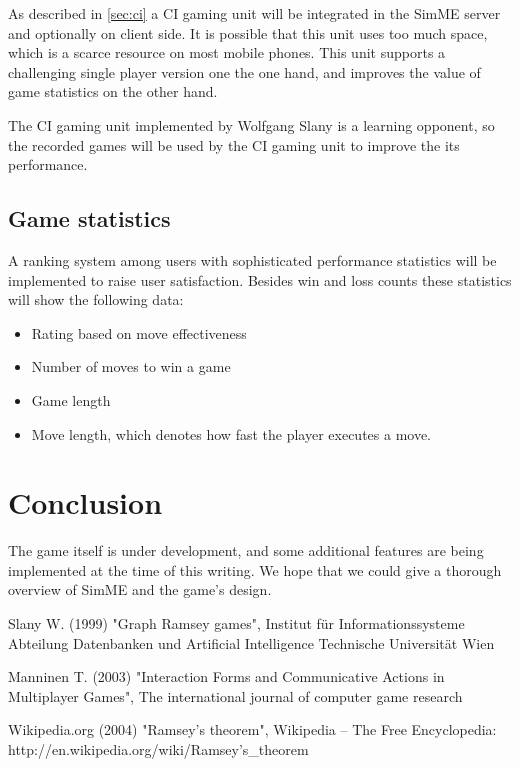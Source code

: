 		As described in \ref{sec:ci} a CI gaming unit will be integrated in the
		SimME server and optionally on client side. It is possible that this
		unit uses too much space, which is a scarce resource on most mobile
		phones. This unit supports a challenging single player version one the
		one hand, and improves the value of game statistics on the other hand.
		
		The CI gaming unit implemented by Wolfgang Slany is a learning opponent,
		so the recorded games will be used by the CI gaming unit to improve the
		its performance.
	
	\subsection{Game statistics}

		A ranking system among users with sophisticated performance statistics
		will be implemented to raise user satisfaction. Besides win and loss
		counts these statistics will show the following data:
		
		\begin{itemize}
		
			\item Rating based on move effectiveness
			
			\item Number of moves to win a game
		
			\item Game length
			
			\item Move length, which denotes how fast the player executes a move.
		
		\end{itemize}


\section{Conclusion}

	The game itself is under development, and some additional features are being
	implemented at the time of this writing. We hope that we could give a
	thorough overview of SimME and the game's design.



\begin{thebibliography}{10}

	 Slany W. (1999) "Graph Ramsey games",
	Institut f\"ur Informationssysteme Abteilung Datenbanken und Artificial
	Intelligence Technische Universit\"at Wien
	
	 Manninen T. (2003) "Interaction Forms and
	Communicative Actions in Multiplayer Games", The international journal of
	computer game research
	
	 Wikipedia.org (2004) "Ramsey's theorem", Wikipedia --
	The Free Encyclopedia: http://en.wikipedia.org/wiki/Ramsey's\_theorem
	
\end{thebibliography}


